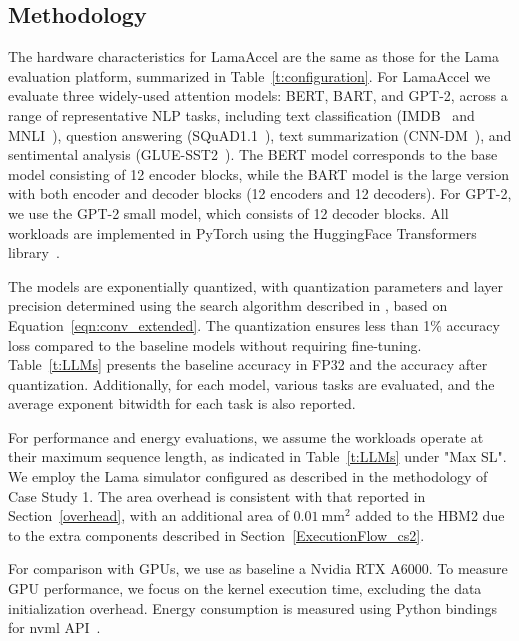 \subsection{Methodology}
The hardware characteristics for LamaAccel are the same as those for the Lama evaluation platform, summarized in Table~\ref{t:configuration}. For LamaAccel we evaluate three widely-used attention models: BERT\cite{bert}, BART\cite{bart}, and GPT-2\cite{gpt-2}, across a range of representative NLP tasks, including text classification (IMDB~\cite{imdb} and MNLI~\cite{mnli}), question answering (SQuAD1.1~\cite{squad}), text summarization (CNN-DM~\cite{cnn-dm,cnn-dm2}), and sentimental analysis (GLUE-SST2~\cite{glue-sst2}). The BERT model corresponds to the base model consisting of 12 encoder blocks, while the BART model is the large version with both encoder and decoder blocks (12 encoders and 12 decoders). For GPT-2, we use the GPT-2 small model, which consists of 12 decoder blocks. All workloads are implemented in PyTorch using the HuggingFace Transformers library~\cite{huggingface}. 

The models are exponentially quantized, with quantization parameters and layer precision determined using the search algorithm described in \cite{DNA-TEQ}, based on Equation~\ref{eqn:conv_extended}. The quantization ensures less than 1\% accuracy loss compared to the baseline models without requiring fine-tuning. Table~\ref{t:LLMs} presents the baseline accuracy in FP32 and the accuracy after quantization. Additionally, for each model, various tasks are evaluated, and the average exponent bitwidth for each task is also reported. 

For performance and energy evaluations, we assume the workloads operate at their maximum sequence length, as indicated in Table~\ref{t:LLMs} under "Max SL". We employ the Lama simulator configured as described in the methodology of Case Study 1. The area overhead is consistent with that reported in Section~\ref{overhead}, with an additional area of $0.01 \ \text{mm}^2$ added to the HBM2 due to the extra components described in Section~\ref{ExecutionFlow_cs2}.


For comparison with GPUs, we use as baseline a Nvidia RTX A6000. To measure GPU performance, we focus on the kernel execution time, excluding the data initialization overhead. Energy consumption is measured using Python bindings for {\selectfont nvml} API~\cite{NVIDIA}. 

